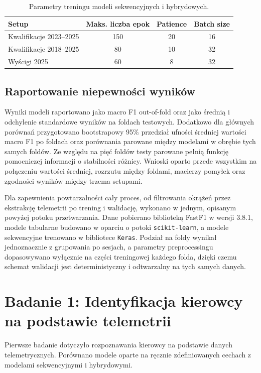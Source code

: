 \documentclass[printmode,pl]{mgr}
\begin{document}
\begin{table}[H]
\centering
\small
\begin{tabular}{lccc}
\toprule
Setup & Maks. liczba epok & Patience & Batch size \\
\midrule
Kwalifikacje 2023--2025 & 150 & 20 & 16 \\
Kwalifikacje 2018--2025 & 80 & 10 & 32 \\
Wyścigi 2025 & 60 & 8 & 32 \\
\bottomrule
\end{tabular}
\caption{Parametry treningu modeli sekwencyjnych i hybrydowych.}
\label{tab:sequence-training-params}
\end{table}

\section{Raportowanie niepewności wyników}

Wyniki modeli raportowano jako macro F1 out-of-fold oraz jako średnią i odchylenie standardowe wyników na foldach testowych. Dodatkowo dla głównych porównań przygotowano bootstrapowy 95\% przedział ufności średniej wartości macro F1 po foldach oraz porównania parowane między modelami w obrębie tych samych foldów. Ze względu na pięć foldów testy parowane pełnią funkcję pomocniczej informacji o stabilności różnicy. Wnioski oparto przede wszystkim na połączeniu wartości średniej, rozrzutu między foldami, macierzy pomyłek oraz zgodności wyników między trzema setupami.

Dla zapewnienia powtarzalności cały proces, od filtrowania okrążeń przez ekstrakcję telemetrii po trening i walidację, wykonano w jednym, opisanym powyżej potoku przetwarzania. Dane pobierano biblioteką FastF1 w wersji 3.8.1, modele tabularne budowano w oparciu o potoki \texttt{scikit-learn}, a modele sekwencyjne trenowano w bibliotece \texttt{Keras}. Podział na foldy wynikał jednoznacznie z grupowania po sesjach, a parametry preprocessingu dopasowywano wyłącznie na części treningowej każdego folda, dzięki czemu schemat walidacji jest deterministyczny i odtwarzalny na tych samych danych.

\chapter{Badanie 1: Identyfikacja kierowcy na podstawie telemetrii}

Pierwsze badanie dotyczyło rozpoznawania kierowcy na podstawie danych telemetrycznych. Porównano modele oparte na ręcznie zdefiniowanych cechach z modelami sekwencyjnymi i hybrydowymi.
\end{document}
